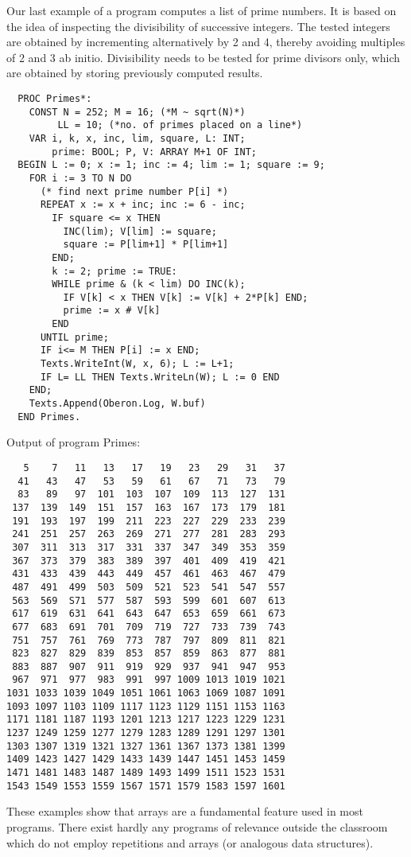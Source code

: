Our last example of a program computes a list of prime numbers. It is based on the idea of
inspecting the divisibility of successive integers. The tested integers are obtained by
incrementing alternatively by 2 and 4, thereby avoiding multiples of 2 and 3 ab initio.
Divisibility needs to be tested for prime divisors only, which are obtained by storing
previously computed results.
\begin{verbatim}
  PROC Primes*:
    CONST N = 252; M = 16; (*M ~ sqrt(N)*)
         LL = 10; (*no. of primes placed on a line*)
    VAR i, k, x, inc, lim, square, L: INT;
        prime: BOOL; P, V: ARRAY M+1 OF INT;
  BEGIN L := 0; x := 1; inc := 4; lim := 1; square := 9;
    FOR i := 3 TO N DO
      (* find next prime number P[i] *)
      REPEAT x := x + inc; inc := 6 - inc;
        IF square <= x THEN
          INC(lim); V[lim] := square;
          square := P[lim+1] * P[lim+1]
        END;
        k := 2; prime := TRUE:
        WHILE prime & (k < lim) DO INC(k);
          IF V[k] < x THEN V[k] := V[k] + 2*P[k] END;
          prime := x # V[k]
        END
      UNTIL prime;
      IF i<= M THEN P[i] := x END;
      Texts.WriteInt(W, x, 6); L := L+1;
      IF L= LL THEN Texts.WriteLn(W); L := 0 END
    END;
    Texts.Append(Oberon.Log, W.buf)
  END Primes.
\end{verbatim}
Output of program Primes:
\begin{verbatim}
   5    7   11   13   17   19   23   29   31   37
  41   43   47   53   59   61   67   71   73   79
  83   89   97  101  103  107  109  113  127  131
 137  139  149  151  157  163  167  173  179  181
 191  193  197  199  211  223  227  229  233  239
 241  251  257  263  269  271  277  281  283  293
 307  311  313  317  331  337  347  349  353  359
 367  373  379  383  389  397  401  409  419  421
 431  433  439  443  449  457  461  463  467  479
 487  491  499  503  509  521  523  541  547  557
 563  569  S71  577  587  593  599  601  607  613
 617  619  631  641  643  647  653  659  661  673
 677  683  691  701  709  719  727  733  739  743
 751  757  761  769  773  787  797  809  811  821
 823  827  829  839  853  857  859  863  877  881
 883  887  907  911  919  929  937  941  947  953
 967  971  977  983  991  997 1009 1013 1019 1021
1031 1033 1039 1049 1051 1061 1063 1069 1087 1091
1093 1097 1103 1109 1117 1123 1129 1151 1153 1163
1171 1181 1187 1193 1201 1213 1217 1223 1229 1231
1237 1249 1259 1277 1279 1283 1289 1291 1297 1301
1303 1307 1319 1321 1327 1361 1367 1373 1381 1399
1409 1423 1427 1429 1433 1439 1447 1451 1453 1459
1471 1481 1483 1487 1489 1493 1499 1511 1523 1531
1543 1549 1553 1559 1567 1571 1579 1583 1597 1601
\end{verbatim}

These examples show that arrays are a fundamental feature used in most programs.
There exist hardly any programs of relevance outside the classroom which do not
employ repetitions and arrays (or analogous data structures).
